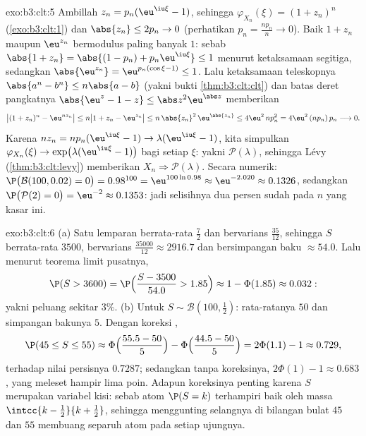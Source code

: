 \begin{solution}{exo:b3:clt:5}
Ambillah $z_n = p_n(\eu^{\iu\xi} - 1)$, sehingga $\varphi_{X_n}(\xi) =
(1 + z_n)^n$ (\cref{exo:b3:clt:1}) dan $\abs{z_n} \leq 2p_n
\to 0$ (perhatikan $p_n = \frac{np_n}n \to 0$). Baik $1 + z_n$ maupun
$\eu^{z_n}$ bermodulus paling banyak $1$: sebab $\abs{1 + z_n} =
\abs{(1 - p_n) + p_n\eu^{\iu\xi}} \leq 1$ menurut ketaksamaan
segitiga, sedangkan $\abs{\eu^{z_n}} = \eu^{p_n(\cos\xi - 1)}
\leq 1$. Lalu ketaksamaan teleskopnya $\abs{a^n - b^n} \leq
n\abs{a - b}$ (yakni bukti \cref{thm:b3:clt:clt}) dan batas
deret pangkatnya $\abs{\eu^z - 1 - z} \leq
\abs z^2\eu^{\abs z}$ memberikan
\[
\bigl|(1 + z_n)^n - \eu^{nz_n}\bigr| \leq n\bigl|1 + z_n -
\eu^{z_n}\bigr| \leq n\,\abs{z_n}^2\,\eu^{\abs{z_n}} \leq
4\eu^2\,np_n^2 = 4\eu^2\,(np_n)\,p_n \longrightarrow 0 .
\]
Karena $nz_n = np_n(\eu^{\iu\xi} - 1) \to
\lambda(\eu^{\iu\xi} - 1)$, kita simpulkan $\varphi_{X_n}(\xi)
\to \exp\bigl(\lambda(\eu^{\iu\xi} - 1)\bigr)$ bagi setiap
$\xi$: yakni  $\mathcal P(\lambda)$, sehingga Lévy
(\cref{thm:b3:clt:levy}) memberikan $X_n \Rightarrow \mathcal
P(\lambda)$. Secara numerik: $\P\bigl(\mathcal B(100, 0.02) =
0\bigr) = 0.98^{100} = \eu^{100\ln 0.98} \approx
\eu^{-2.020} \approx 0.1326$, sedangkan $\P\bigl(\mathcal P(2) =
0\bigr) = \eu^{-2} \approx 0.1353$: jadi selisihnya dua persen
sudah pada $n$ yang kasar ini.
\end{solution}

\begin{solution}{exo:b3:clt:6}
(a) Satu lemparan berrata-rata $\frac72$ dan bervarians
$\frac{35}{12}$, sehingga $S$ berrata-rata $3500$, bervarians
$\frac{35000}{12} \approx 2916.7$ dan bersimpangan baku
$\approx 54.0$. Lalu menurut teorema limit pusatnya,
\[
\P(S > 3600) = \P\Bigl(\frac{S - 3500}{54.0} > 1.85\Bigr)
\approx 1 - \Phi(1.85) \approx 0.032 :
\]
yakni peluang sekitar $3\%$.
(b) Untuk $S \sim \mathcal B(100, \frac12)$: rata-ratanya $50$ dan simpangan
bakunya $5$. Dengan koreksi ,
\[
\P(45 \leq S \leq 55) \approx
\Phi\Bigl(\frac{55.5 - 50}{5}\Bigr) -
\Phi\Bigl(\frac{44.5 - 50}{5}\Bigr) = 2\Phi(1.1) - 1
\approx 0.729,
\]
terhadap nilai persisnya $0.7287$; sedangkan tanpa koreksinya,
$2\Phi(1) - 1 \approx 0.683$, yang meleset hampir lima poin. Adapun
koreksinya penting karena $S$ merupakan variabel kisi: sebab
atom $\P(S = k)$ terhampiri baik oleh massa 
$\intcc{k - \frac12}{k + \frac12}$, sehingga menggunting
selangnya di bilangan bulat $45$ dan $55$ membuang separuh atom
pada setiap ujungnya.
\end{solution}

